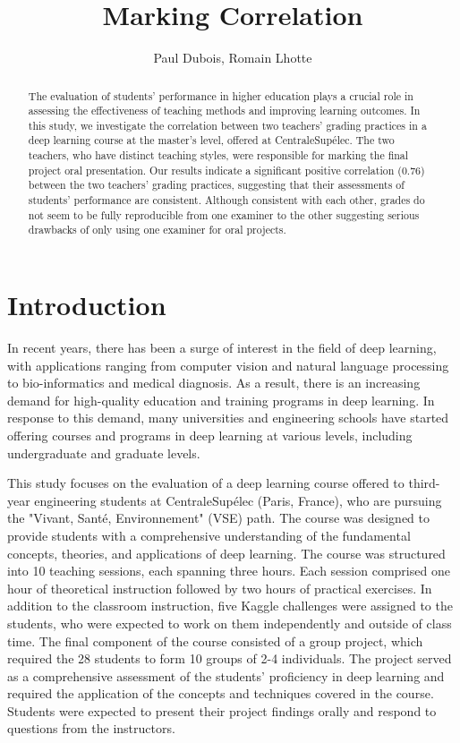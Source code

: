 \documentclass[a4paper]{article}
\title{Marking Correlation}
\author{Paul Dubois, Romain Lhotte}
\begin{document}
	\maketitle
	\begin{abstract}
		The evaluation of students' performance in higher education plays a crucial role in assessing the effectiveness of teaching methods and improving learning outcomes.
		In this study, we investigate the correlation between two teachers' grading practices in a deep learning course at the master's level, offered at CentraleSupélec.
		The two teachers, who have distinct teaching styles, were responsible for marking the final project oral presentation.
		Our results indicate a significant positive correlation (0.76) between the two teachers' grading practices, suggesting that their assessments of students' performance are consistent.
		Although consistent with each other, grades do not seem to be fully reproducible from one examiner to the other suggesting serious drawbacks of only using one examiner for oral projects.
	\end{abstract}
	
	\section{Introduction}
	In recent years, there has been a surge of interest in the field of deep learning, with applications ranging from computer vision and natural language processing to bio-informatics and medical diagnosis.
	As a result, there is an increasing demand for high-quality education and training programs in deep learning.
	In response to this demand, many universities and engineering schools have started offering courses and programs in deep learning at various levels, including undergraduate and graduate levels.
	
	This study focuses on the evaluation of a deep learning course offered to third-year engineering students at CentraleSupélec (Paris, France), who are pursuing the "Vivant, Santé, Environnement" (VSE) path.
	The course was designed to provide students with a comprehensive understanding of the fundamental concepts, theories, and applications of deep learning.
	The course was structured into 10 teaching sessions, each spanning three hours.
	Each session comprised one hour of theoretical instruction followed by two hours of practical exercises.
	In addition to the classroom instruction, five Kaggle challenges were assigned to the students, who were expected to work on them independently and outside of class time.
	The final component of the course consisted of a group project, which required the 28 students to form 10 groups of 2-4 individuals.
	The project served as a comprehensive assessment of the students' proficiency in deep learning and required the application of the concepts and techniques covered in the course.
	Students were expected to present their project findings orally and respond to questions from the instructors.
	
\end{document}
